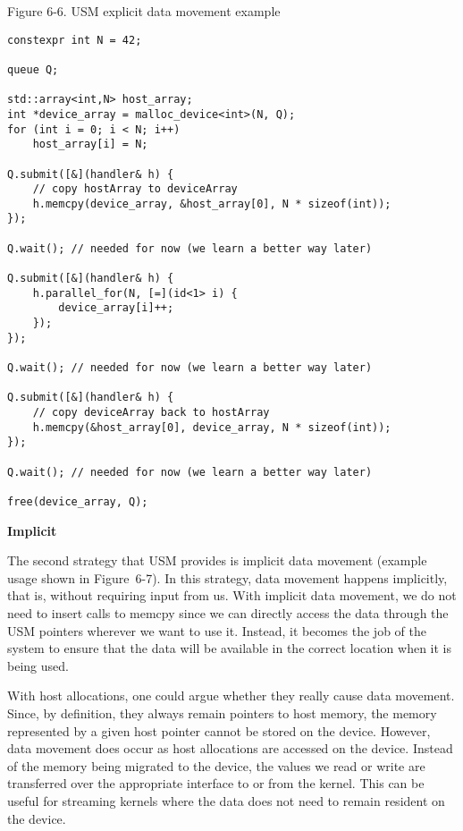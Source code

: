 \hspace*{\fill} \par %
Figure 6-6. USM explicit data movement example
\begin{lstlisting}[caption={}]
constexpr int N = 42;

queue Q;

std::array<int,N> host_array;
int *device_array = malloc_device<int>(N, Q);
for (int i = 0; i < N; i++)
	host_array[i] = N;

Q.submit([&](handler& h) {
	// copy hostArray to deviceArray
	h.memcpy(device_array, &host_array[0], N * sizeof(int));
});

Q.wait(); // needed for now (we learn a better way later)

Q.submit([&](handler& h) {
	h.parallel_for(N, [=](id<1> i) {
		device_array[i]++;
	});
});

Q.wait(); // needed for now (we learn a better way later)

Q.submit([&](handler& h) {
	// copy deviceArray back to hostArray
	h.memcpy(&host_array[0], device_array, N * sizeof(int));
});

Q.wait(); // needed for now (we learn a better way later)

free(device_array, Q);
\end{lstlisting}

\hspace*{\fill} \par %
\textbf{Implicit}

The second strategy that USM provides is implicit data movement (example usage shown in Figure 6-7). In this strategy, data movement happens implicitly, that is, without requiring input from us. With implicit data movement, we do not need to insert calls to memcpy since we can directly access the data through the USM pointers wherever we want to use it. Instead, it becomes the job of the system to ensure that the data will be available in the correct location when it is being used.\par

With host allocations, one could argue whether they really cause data movement. Since, by definition, they always remain pointers to host memory, the memory represented by a given host pointer cannot be stored on the device. However, data movement does occur as host allocations are accessed on the device. Instead of the memory being migrated to the device, the values we read or write are transferred over the appropriate interface to or from the kernel. This can be useful for streaming kernels where the data does not need to remain resident on the device.\par

